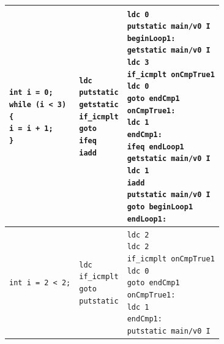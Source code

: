 \begin{table}[bth]
\begin{tabular}{|l|l|l|}
		\makecell[l]{\texttt{int i = 0;} \\ \texttt{while (i < 3)} \\ \texttt{\{} \\ \quad\texttt{i = i + 1;} \\ \texttt{\}}} & \makecell[l]{\texttt{ldc} \\ \texttt{putstatic} \\ \texttt{getstatic} \\ \texttt{if\_icmplt} \\ \texttt{goto} \\ \texttt{ifeq} \\ \texttt{iadd}} & \makecell[l]{\texttt{ldc 0} \\ \texttt{putstatic main/v0 I} \\ \texttt{beginLoop1:} \\ \texttt{getstatic main/v0 I} \\ \texttt{ldc 3} \\ \texttt{if\_icmplt onCmpTrue1} \\ \texttt{ldc 0} \\ \texttt{goto endCmp1} \\ \texttt{onCmpTrue1:} \\ \texttt{ldc 1} \\ \texttt{endCmp1:} \\ \texttt{ifeq endLoop1} \\ \texttt{getstatic main/v0 I} \\ \texttt{ldc 1} \\ \texttt{iadd} \\ \texttt{putstatic main/v0 I} \\ \texttt{goto beginLoop1} \\ \texttt{endLoop1:}} \\ \hline
		\texttt{int i = 2 < 2;} & \makecell[l]{\texttt{ldc} \\ \texttt{if\_icmplt} \\ \texttt{goto} \\ \texttt{putstatic}} & \makecell[l]{\texttt{ldc 2} \\ \texttt{ldc 2} \\ \texttt{if\_icmplt onCmpTrue1} \\ \texttt{ldc 0} \\ \texttt{goto endCmp1} \\ \texttt{onCmpTrue1:} \\ \texttt{ldc 1} \\ \texttt{endCmp1:} \\ \texttt{putstatic main/v0 I}} \\ \hline
	\end{tabular}
\end{table}
\noindent

